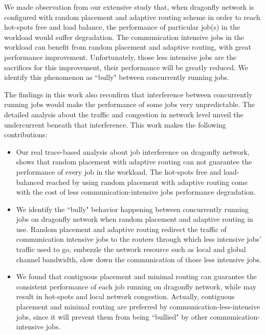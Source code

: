 \documentclass[conference,compsoc]{IEEEtran}
\begin{document}


We made observation from our extensive study that, when dragonfly network is configured with random placement and adaptive routing scheme in order to reach hot-spots free and load balance, the performance of particular job(s) in the workload would suffer degradation. The communication intensive jobs in the workload can benefit from random placement and adaptive routing, with great performance improvement. Unfortunately, those less intensive jobs are the sacrifices for this improvement, their performance will be greatly reduced. We identify this phenomenon as ``bully" between concurrently running jobs.

The findings in this work also reconfirm that interference between concurrently running jobs would make the performance of some jobs very unpredictable. The detailed analysis about the traffic and congestion in network level unveil the undercurrent beneath that interference. This work makes the following contributions:

\begin{itemize}
   
    \item Our real trace-based analysis about job interference on dragonfly network, shows that random placement with adaptive routing can not guarantee the performance of every job in the workload. The hot-spots free and load-balanced reached by using random placement with adaptive routing come with the cost of less communication-intensive jobs performance degradation. 

    \item We identify the ``bully" behavior happening between concurrently running jobs on dragonfly network when random placement and adaptive routing in use. Random placement and adaptive routing redirect the traffic of communication intensive jobs to the routers through which less intensive jobs' traffic used to go, embezzle the network resource such as local and global channel bandwidth, slow down the communication of those less intensive jobs.

    
    \item We found that contiguous placement and minimal routing can guarantee the consistent performance of each job running on dragonfly network, while may result in hot-spots and local network congestion. Actually, contiguous placement and minimal routing are preferred by communication-less-intensive jobs, since it will prevent them from being ``bullied" by other communication-intensive jobs.
    
         
\end{itemize}
\end{document}

